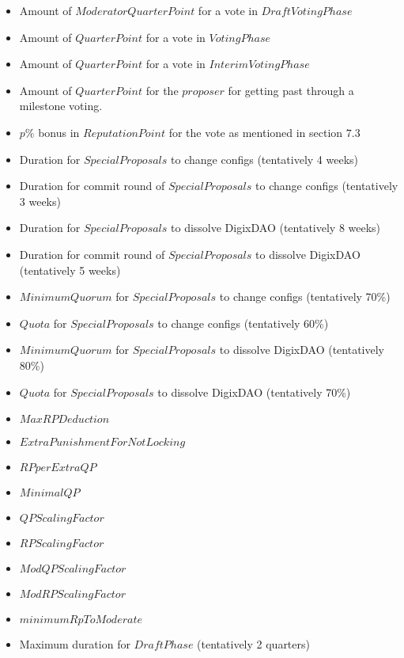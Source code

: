 \documentclass[11pt,a4paper,titlepage]{article}
\begin{document}
{\begin{itemize}
		\item Amount of $ModeratorQuarterPoint$ for a vote in $Draft Voting Phase$
		\item Amount of $QuarterPoint$ for a vote in $Voting Phase$
		\item Amount of $QuarterPoint$ for a vote in $Interim Voting Phase$
		\item Amount of $QuarterPoint$ for the $proposer$ for getting past through a milestone voting.
		\item $p\%$ bonus in $ReputationPoint$ for the vote as mentioned in section $7.3$
		\item Duration for $Special Proposals$ to change configs (tentatively 4 weeks)
		\item Duration for commit round of $Special Proposals$ to change configs (tentatively 3 weeks)
		\item Duration for $Special Proposals$ to dissolve DigixDAO (tentatively 8 weeks)
		\item Duration for commit round of $Special Proposals$ to dissolve DigixDAO (tentatively 5 weeks)
		\item $Minimum Quorum$ for $Special Proposals$ to change configs (tentatively 70\%)
		\item $Quota$ for $Special Proposals$ to change configs (tentatively 60\%)
		\item $Minimum Quorum$ for $Special Proposals$ to dissolve DigixDAO (tentatively 80\%)
		\item $Quota$ for $Special Proposals$ to dissolve DigixDAO (tentatively 70\%)
		\item $MaxRPDeduction$
		\item $ExtraPunishmentForNotLocking$
		\item $RPperExtraQP$
		\item $MinimalQP$
		\item $QPScalingFactor$
		\item $RPScalingFactor$
		\item $ModQPScalingFactor$
		\item $ModRPScalingFactor$
		\item $minimumRpToModerate$
		\item Maximum duration for $Draft Phase$ (tentatively 2 quarters)
	\end{itemize}
}
\end{document}
